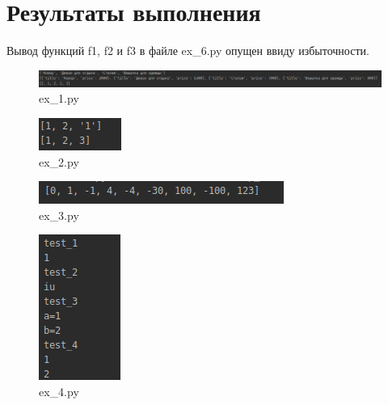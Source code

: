 \documentclass{article}
\begin{document}
\section{Результаты выполнения}
Вывод функций f1, f2 и f3 в файле ex\_6.py опущен ввиду избыточности.

\begin{figure}[h!]
    \centering
    \includegraphics[width=\textwidth]{ex1.png}
    \caption{ex\_1.py}
    \label{fig: ex1}
\end{figure}

\begin{figure}[h!]
    \centering
    \includegraphics{ex2.png}
    \caption{ex\_2.py}
    \label{fig: ex2}
\end{figure}

\begin{figure}[h!]
    \centering
    \includegraphics[width=\textwidth]{ex3.png}
    \caption{ex\_3.py}
    \label{fig: ex3}
\end{figure}

\begin{figure}[h!]
    \centering
    \includegraphics{ex4.png}
    \caption{ex\_4.py}
    \label{fig: ex4}
\end{figure}
\end{document}
